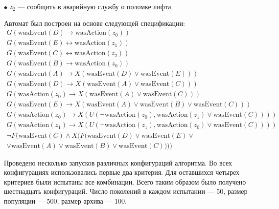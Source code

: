 \documentclass[12pt,fleqn]{article}
\begin{document}
$\bullet$ $z_2$ --- сообщить в аварийную службу о поломке лифта.

Автомат был построен на основе следующей спецификации:
\begin{multline*}
G(\text{wasEvent}(D) \rightarrow \text{wasAction}(z_0))\\
G(\text{wasEvent}(E) \leftrightarrow \text{wasAction}(z_1))\\
G(\text{wasEvent}(C) \leftrightarrow \text{wasAction}(z_2))\\
G(\text{wasEvent}(B) \rightarrow \text{wasAction}(z_0))\\
G(\text{wasEvent}(A) \rightarrow X(\text{wasEvent}(D) \vee \text{wasEvent}(E)))\\
G(\text{wasEvent}(D) \rightarrow X(\text{wasEvent}(A) \vee \text{wasEvent}(C)))\\
G(\text{wasAction}(z_0) \rightarrow X(\text{wasEvent}(A) \vee \text{wasEvent}(C)))\\
G(\text{wasEvent}(E) \rightarrow X(\text{wasEvent}(A) \vee \text{wasEvent}(B) \vee \text{wasEvent}(C)))\\
G(\text{wasAction}(z_0) \rightarrow X(U(\lnot \text{wasAction}(z_0), \text{wasAction}(z_1) \vee \text{wasEvent}(C))))\\
G(\text{wasAction}(z_1) \rightarrow X(U(\lnot \text{wasAction}(z_1), \text{wasAction}(z_0) \vee \text{wasEvent}(C))))\\
\lnot F(\text{wasEvent}(C) \wedge X(F(\text{wasEvent}(D) \vee \text{wasEvent}(E) \vee \\ \vee \text{wasEvent}(A) \vee \text{wasEvent}(B) \vee \text{wasEvent}(C))))
\end{multline*}

Проведено несколько запусков различных конфигураций алгоритма. Во всех конфигурациях использовались первые два критерия.
Для оставшихся четырех критериев были испытаны все комбинации. Всего таким образом было получено шестнадцать конфигураций.
Число поколений в каждом испытании --- 50, размер популяции --- 500, размер архива --- 100.
\end{document}

